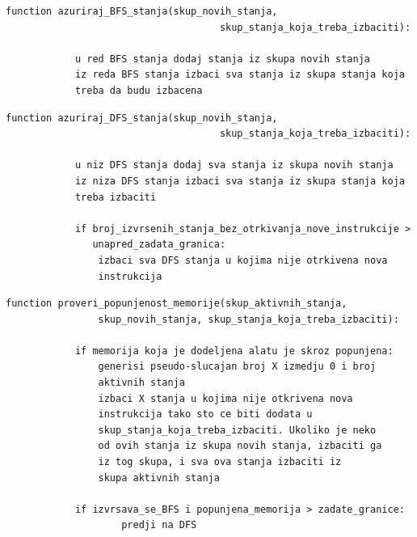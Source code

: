 \documentclass[12pt,oneside]{memoir}
\begin{document}
    \begin{lstlisting}[caption={Pseudokod funkcije za ažuriranje BFS stanja},captionpos=b,label={lst:azuriraj_BFS}]
        function azuriraj_BFS_stanja(skup_novih_stanja, 
                                     skup_stanja_koja_treba_izbaciti):
                                     
            u red BFS stanja dodaj stanja iz skupa novih stanja
            iz reda BFS stanja izbaci sva stanja iz skupa stanja koja 
            treba da budu izbacena
    \end{lstlisting}
    \newpage
    \begin{lstlisting}[caption={Pseudokod funkcije za ažuriranje DFS stanja},captionpos=b,label={lst:azuriraj_DFS}]
        function azuriraj_DFS_stanja(skup_novih_stanja, 
                                     skup_stanja_koja_treba_izbaciti):
                                     
            u niz DFS stanja dodaj sva stanja iz skupa novih stanja
            iz niza DFS stanja izbaci sva stanja iz skupa stanja koja 
            treba izbaciti
            
            if broj_izvrsenih_stanja_bez_otrkivanja_nove_instrukcije > 
               unapred_zadata_granica:
                izbaci sva DFS stanja u kojima nije otrkivena nova 
                instrukcija
    \end{lstlisting}
    
    \begin{lstlisting}[caption={Pseudokod funkcije koja proverava koliko je memorije popunjeno},captionpos=b,label={lst:popunjena_memorija}]
        function proveri_popunjenost_memorije(skup_aktivnih_stanja, 
                skup_novih_stanja, skup_stanja_koja_treba_izbaciti):
            
            if memorija koja je dodeljena alatu je skroz popunjena:
                generisi pseudo-slucajan broj X izmedju 0 i broj 
                aktivnih stanja
                izbaci X stanja u kojima nije otkrivena nova 
                instrukcija tako sto ce biti dodata u 
                skup_stanja_koja_treba_izbaciti. Ukoliko je neko
                od ovih stanja iz skupa novih stanja, izbaciti ga 
                iz tog skupa, i sva ova stanja izbaciti iz
                skupa aktivnih stanja
                
            if izvrsava_se_BFS i popunjena_memorija > zadate_granice:
                    predji na DFS

                
    \end{lstlisting}
\end{document}
